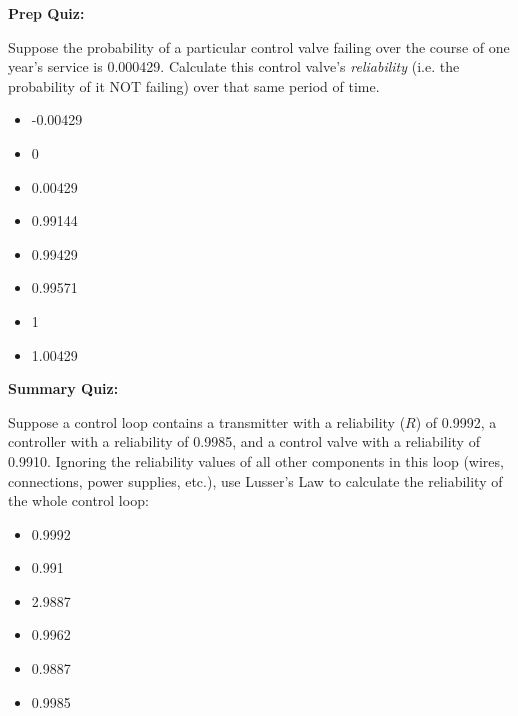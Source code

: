 \vfil \eject

\noindent
{\bf Prep Quiz:}

Suppose the probability of a particular control valve failing over the course of one year's service is 0.000429.  Calculate this control valve's {\it reliability} (i.e. the probability of it NOT failing) over that same period of time.

\begin{itemize}
\item{} -0.00429
\item{} 0
\item{} 0.00429
\item{} 0.99144
\item{} 0.99429
\item{} 0.99571
\item{} 1
\item{} 1.00429
\end{itemize}




\vfil \eject

\noindent
{\bf Summary Quiz:}

Suppose a control loop contains a transmitter with a reliability ($R$) of 0.9992, a controller with a reliability of 0.9985, and a control valve with a reliability of 0.9910.  Ignoring the reliability values of all other components in this loop (wires, connections, power supplies, etc.), use Lusser's Law to calculate the reliability of the whole control loop:

\begin{itemize}
\item{} 0.9992
\vskip 5pt 
\item{} 0.991
\vskip 5pt 
\item{} 2.9887
\vskip 5pt 
\item{} 0.9962 
\vskip 5pt 
\item{} 0.9887
\vskip 5pt 
\item{} 0.9985 
\end{itemize}



